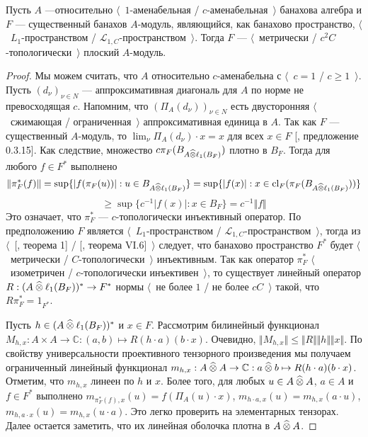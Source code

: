 \begin{proposition}\label{MetTopEssL1FlatModAoverAmenBanAlg} Пусть $A$ ---относительно $\langle$~$1$-аменабельная / $c$-аменабельная~$\rangle$ банахова алгебра и $F$ --- существенный банахов $A$-модуль, являющийся, как банахово пространство, $\langle$~$L_1$-пространством / $\mathscr{L}_{1,C}$-пространством~$\rangle$. Тогда $F$ --- $\langle$~метрически / $c^2C$-топологически~$\rangle$ плоский $A$-модуль.
\end{proposition}
\begin{proof} 
Мы можем считать, что $A$ относительно $c$-аменабельна с $\langle$~$c=1$ / $c\geq 1$~$\rangle$. Пусть $(d_\nu)_{\nu\in N}$ --- аппроксимативная диагональ для $A$ по норме не превосходящая $c$. Напомним, что $(\Pi_A(d_\nu))_{\nu\in N}$ есть двусторонняя $\langle$~сжимающая / ограниченная~$\rangle$ аппроксимативная единица в $A$. Так как $F$ --- существенный $A$-модуль, то $\lim_{\nu}\Pi_A(d_\nu)\cdot x=x$ для всех $x\in F$ [\cite{HelHomolBanTopAlg}, предложение 0.3.15]. Как следствие, множество $c\pi_F(B_{A\mathbin{\widehat{\otimes}}\ell_1(B_F)})$ плотно в $B_F$. Тогда для любого $f\in F^*$ выполнено
$$
\Vert\pi_F^*(f)\Vert
=\sup\{|f(\pi_F(u))|:u\in B_{A\mathbin{\widehat{\otimes}}\ell_1(B_F)}\}
=\sup\{|f(x)|:x\in \operatorname{cl}_F(\pi_F(B_{A\mathbin{\widehat{\otimes}}\ell_1(B_F)}))\}
$$
$$
\geq\sup\{c^{-1}|f(x)|:x\in B_F\}=c^{-1}\Vert f\Vert
$$
Это означает, что $\pi_F^*$ --- $c$-топологически инъективный оператор. По предположению $F$ является $\langle$~$L_1$-пространством / $\mathscr{L}_{1,C}$-пространством~$\rangle$, тогда из $\langle$~[\cite{GrothMetrProjFlatBanSp}, теорема 1] / [\cite{StegRethNucOpL1LInfSp}, теорема VI.6]~$\rangle$ следует, что банахово пространство $F^*$ будет $\langle$~метрически / $C$-топологически~$\rangle$ инъективным. Так как оператор $\pi_F^*$ $\langle$~изометричен / $c$-топологически инъективен~$\rangle$, то существует линейный оператор $R:(A\mathbin{\widehat{\otimes}}\ell_1(B_F))^*\to F^*$ нормы $\langle$~не более $1$ / не более $cC$~$\rangle$ такой, что $R\pi_F^*=1_{F^*}$.

Пусть $h\in (A\mathbin{\widehat{\otimes}}\ell_1(B_F))^*$ и $x\in F$. Рассмотрим билинейный функционал $M_{h,x}:A\times A\to\mathbb{C}:(a,b)\mapsto R(h\cdot a)(b\cdot x)$. Очевидно, $\Vert M_{h,x}\Vert\leq\Vert R\Vert\Vert h\Vert\Vert x\Vert$. По свойству универсальности проективного тензорного произведения мы получаем ограниченный линейный функционал $m_{h,x}:A\mathbin{\widehat{\otimes}} A\to\mathbb{C}:a\mathbin{\widehat{\otimes}} b\mapsto R(h\cdot a)(b\cdot x)$. Отметим, что $m_{h,x}$ линеен по $h$ и $x$. Более того, для любых $u\in A\mathbin{\widehat{\otimes}} A$, $a\in A$ и $f\in F^*$ выполнено $m_{\pi_F^*(f),x}(u)=f(\Pi_A(u)\cdot x)$, $m_{h\cdot a,x}(u)=m_{h,x}(a\cdot u)$, $m_{h,a\cdot x}(u)=m_{h,x}(u\cdot a)$. Это легко проверить на элементарных тензорах. Далее остается заметить, что их линейная оболочка плотна в $A\mathbin{\widehat{\otimes}} A$.


\end{proof}
